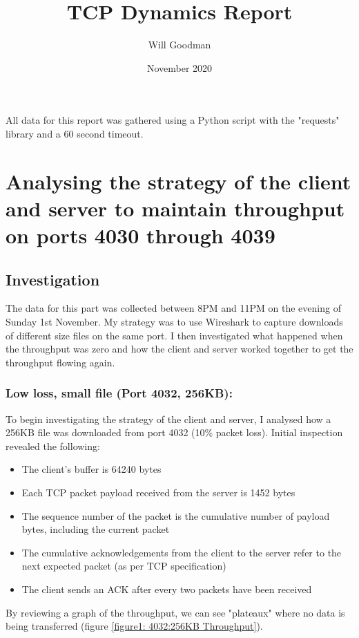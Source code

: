 \documentclass[12pt]{article}
\title{TCP Dynamics Report}
\date{November 2020}
\author{Will Goodman}
\begin{document}
\maketitle

All data for this report was gathered using a Python script with the "requests" library and a 60 second timeout.

\section{Analysing the strategy of the client and server to maintain throughput on ports 4030 through 4039}
\subsection*{Investigation}
The data for this part was collected between 8PM and 11PM on the evening of Sunday 1st November.
My strategy was to use Wireshark to capture downloads of different size files on the same port.
I then investigated what happened when the throughput was zero and how the client and server worked together to get the throughput flowing again.

\subsubsection*{Low loss, small file (Port 4032, 256KB):}
To begin investigating the strategy of the client and server, I analysed how a 256KB file was downloaded from port 4032 (10\% packet loss).
Initial inspection revealed the following:
\begin{itemize}
  \item The client's buffer is 64240 bytes
  \item Each TCP packet payload received from the server is 1452 bytes
  \item The sequence number of the packet is the cumulative number of payload bytes, including the current packet
  \item The cumulative acknowledgements from the client to the server refer to the next expected packet (as per TCP specification)
  \item The client sends an ACK after every two packets have been received
\end{itemize}

By reviewing a graph of the throughput, we can see "plateaux" where no data is being transferred (figure \ref{figure1: 4032:256KB Throughput}).
\end{document}

